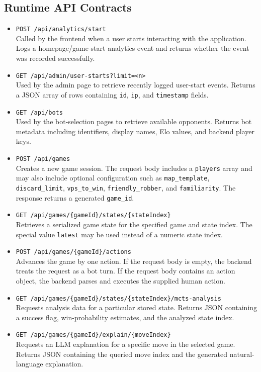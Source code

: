 \documentclass[12pt, titlepage]{article}
\begin{document}
\subsection*{Runtime API Contracts}

\begin{itemize}
    \item \texttt{POST /api/analytics/start} \\
    Called by the frontend when a user starts interacting with the application.
    Logs a homepage/game-start analytics event and returns whether the event was recorded successfully.

    \item \texttt{GET /api/admin/user-starts?limit=<n>} \\
    Used by the admin page to retrieve recently logged user-start events.
    Returns a JSON array of rows containing \texttt{id}, \texttt{ip}, and \texttt{timestamp} fields.

    \item \texttt{GET /api/bots} \\
    Used by the bot-selection pages to retrieve available opponents.
    Returns bot metadata including identifiers, display names, Elo values, and backend player keys.

    \item \texttt{POST /api/games} \\
    Creates a new game session.
    The request body includes a \texttt{players} array and may also include optional configuration such as
    \texttt{map\_template}, \texttt{discard\_limit}, \texttt{vps\_to\_win}, \texttt{friendly\_robber}, and \texttt{familiarity}.
    The response returns a generated \texttt{game\_id}.

    \item \texttt{GET /api/games/\{gameId\}/states/\{stateIndex\}} \\
    Retrieves a serialized game state for the specified game and state index.
    The special value \texttt{latest} may be used instead of a numeric state index.

    \item \texttt{POST /api/games/\{gameId\}/actions} \\
    Advances the game by one action.
    If the request body is empty, the backend treats the request as a bot turn.
    If the request body contains an action object, the backend parses and executes the supplied human action.

    \item \texttt{GET /api/games/\{gameId\}/states/\{stateIndex\}/mcts-analysis} \\
    Requests analysis data for a particular stored state.
    Returns JSON containing a success flag, win-probability estimates, and the analyzed state index.

    \item \texttt{GET /api/games/\{gameId\}/explain/\{moveIndex\}} \\
    Requests an LLM explanation for a specific move in the selected game.
    Returns JSON containing the queried move index and the generated natural-language explanation.
\end{itemize}
\end{document}
